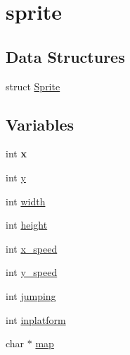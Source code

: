 \hypertarget{group__sprite}{}\section{sprite}
\label{group__sprite}
\subsection*{Data Structures}
\begin{DoxyCompactItemize}
\item 
struct \hyperlink{struct_sprite}{Sprite}
\end{DoxyCompactItemize}
\subsection*{Variables}
\begin{DoxyCompactItemize}
\item 
\hypertarget{group__sprite_ga6150e0515f7202e2fb518f7206ed97dc}{}int {\bfseries x}\label{group__sprite_ga6150e0515f7202e2fb518f7206ed97dc}

\item 
int \hyperlink{group__sprite_ga0a2f84ed7838f07779ae24c5a9086d33}{y}
\item 
int \hyperlink{group__sprite_ga2474a5474cbff19523a51eb1de01cda4}{width}
\item 
int \hyperlink{group__sprite_gad12fc34ce789bce6c8a05d8a17138534}{height}
\item 
int \hyperlink{group__sprite_ga56d83ad8a1afb318706057c1ec72f797}{x\+\_\+speed}
\item 
int \hyperlink{group__sprite_ga081c2d7f9619a32bd806baa1831ce1c1}{y\+\_\+speed}
\item 
int \hyperlink{group__sprite_gad427edc16087f64ef18fb771dd34cc0b}{jumping}
\item 
int \hyperlink{group__sprite_ga44675e845628c15d8a696990a9494d04}{inplatform}
\item 
char $\ast$ \hyperlink{group__sprite_ga7b00b1bfd666e26484471bd17a74eaa9}{map}
\end{DoxyCompactItemize}
